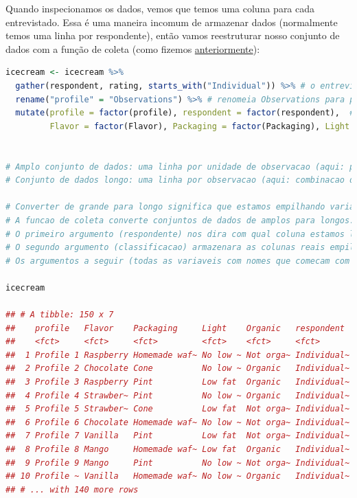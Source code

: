 \documentclass{article}
\begin{document}
Quando inspecionamos os dados, vemos que temos uma coluna para cada entrevistado. Essa é uma maneira incomum de armazenar dados (normalmente temos uma linha por respondente), então vamos reestruturar nosso conjunto de dados com a função de coleta (como fizemos \href{https://bookdown.org/content/1340/rmanova.html#rmanova}{anteriormente}):

\begin{lstlisting}[language=R]
icecream <- icecream %>% 
  gather(respondent, rating, starts_with("Individual")) %>% # o entrevistado acompanha o respondente, a classificacao armazena as classificacoes do entrevistado e queremos empilhar todas as variaveis que comecam com Individual
  rename("profile" = "Observations") %>% # renomeia Observations para profile
  mutate(profile = factor(profile), respondent = factor(respondent),  # fatorar identificadores
         Flavor = factor(Flavor), Packaging = factor(Packaging), Light = factor(Light), Organic = factor(Organic)) # fatorar os atributos do sorvete


# Amplo conjunto de dados: uma linha por unidade de observacao (aqui: perfil) e varias colunas para as diferentes observacoes (aqui: respondentes)
# Conjunto de dados longo: uma linha por observacao (aqui: combinacao de perfil x respondente)

# Converter de grande para longo significa que estamos empilhando varias colunas umas sobre as outras. Para isso, precisamos de uma variavel extra para acompanhar qual coluna estamos lidando.
# A funcao de coleta converte conjuntos de dados de amplos para longos.
# O primeiro argumento (respondente) nos dira com qual coluna estamos lidando. Essa eh a variavel que armazenara os nomes das colunas que estamos empilhando.
# O segundo argumento (classificacao) armazenara as colunas reais empilhadas umas sobre as outras.
# Os argumentos a seguir (todas as variaveis com nomes que comecam com Individual) sao as colunas que queremos empilhar.

icecream

## # A tibble: 150 x 7
##    profile   Flavor    Packaging     Light    Organic   respondent  rating
##    <fct>     <fct>     <fct>         <fct>    <fct>     <fct>        <dbl>
##  1 Profile 1 Raspberry Homemade waf~ No low ~ Not orga~ Individual~      1
##  2 Profile 2 Chocolate Cone          No low ~ Organic   Individual~      4
##  3 Profile 3 Raspberry Pint          Low fat  Organic   Individual~      2
##  4 Profile 4 Strawber~ Pint          No low ~ Organic   Individual~      7
##  5 Profile 5 Strawber~ Cone          Low fat  Not orga~ Individual~      9
##  6 Profile 6 Chocolate Homemade waf~ No low ~ Not orga~ Individual~      3
##  7 Profile 7 Vanilla   Pint          Low fat  Not orga~ Individual~      5
##  8 Profile 8 Mango     Homemade waf~ Low fat  Organic   Individual~     10
##  9 Profile 9 Mango     Pint          No low ~ Not orga~ Individual~      6
## 10 Profile ~ Vanilla   Homemade waf~ No low ~ Organic   Individual~      8
## # ... with 140 more rows
\end{lstlisting}
\end{document}

